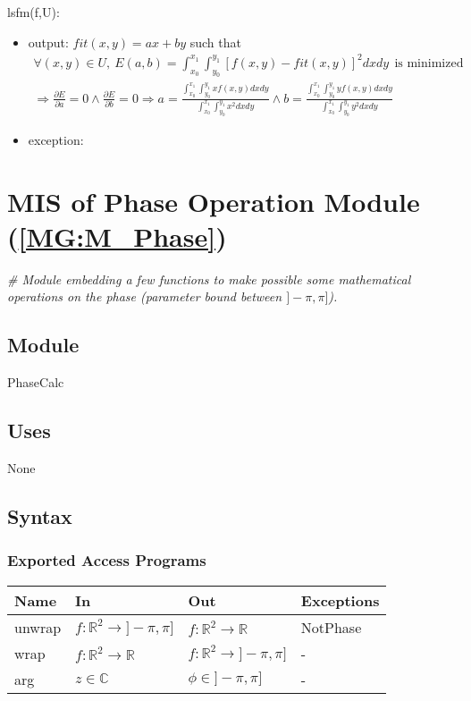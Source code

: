 \documentclass[12pt, titlepage]{article}
\begin{document}
\noindent lsfm(f,U):
\begin{itemize}
\item output: $fit(x,y)=ax + by$ such that
\begin{equation*}
\begin{gathered}
\forall (x,y) \in U, \ 
E(a,b)=\int_{x_0}^{x_1}\int_{y_0}^{y_1}[f(x,y)-fit(x,y)]^2dxdy \ \ \text{is 
minimized} \\
\Rightarrow \frac{\partial E}{\partial a} =0 \wedge \frac{\partial E}{\partial 
b} =0
\Rightarrow a = 
\frac{\int_{x_0}^{x_1}\int_{y_0}^{y_1}xf(x,y)dxdy}{\int_{x_0}^{x_1}\int_{y_0}^{y_1}x^2dxdy} 
\wedge  b= 
\frac{\int_{x_0}^{x_1}\int_{y_0}^{y_1}yf(x,y)dxdy}{\int_{x_0}^{x_1}\int_{y_0}^{y_1}y^2dxdy}
\end{gathered}
\end{equation*}
\item exception:
\end{itemize}


\section{MIS of Phase Operation Module (\texorpdfstring{\cref{MG:M_Phase}}))} 
\label{MIS_Phase}

\noindent\textit{{\#} Module embedding a few functions to make possible some 
mathematical operations on the phase (parameter bound between $]-\pi,\pi]$).} 
\medskip

\subsection{Module}
PhaseCalc
\subsection{Uses}
None
\subsection{Syntax}

\subsubsection{Exported Access Programs}

\begin{center}
\begin{tabular}{p{2cm} p{4cm} p{4cm} p{2cm}}
\hline
\textbf{Name} & \textbf{In} & \textbf{Out} & \textbf{Exceptions} \\
\hline
unwrap & $f:\mathbb{R}^2\rightarrow]-\pi,\pi]$ & 
$f:\mathbb{R}^2\rightarrow\mathbb{R}$ & NotPhase  \\
wrap & $f:\mathbb{R}^2\rightarrow\mathbb{R}$ & 
$f:\mathbb{R}^2\rightarrow]-\pi,\pi]$ & - \\
arg & $z \in \mathbb{C}$ & $\phi \in ]-\pi,\pi]$ &  - \\
\hline
\end{tabular}
\end{center}
\end{document}

